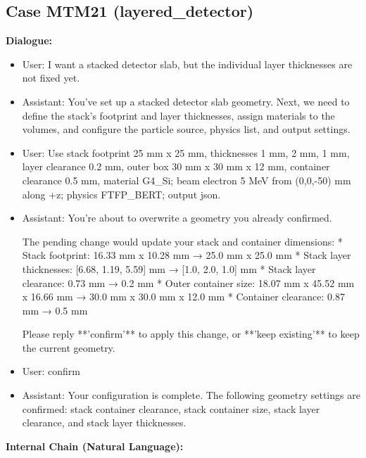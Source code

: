 \documentclass[11pt]{ctexart}
\begin{document}
\subsection{Case MTM21 (layered\_detector)}
\textbf{Dialogue:}
\begin{itemize}
\item User: I want a stacked detector slab, but the individual layer thicknesses are not fixed yet.
\item Assistant: You've set up a stacked detector slab geometry. Next, we need to define the stack's footprint and layer thicknesses, assign materials to the volumes, and configure the particle source, physics list, and output settings.
\item User: Use stack footprint 25 mm x 25 mm, thicknesses 1 mm, 2 mm, 1 mm, layer clearance 0.2 mm, outer box 30 mm x 30 mm x 12 mm, container clearance 0.5 mm, material G4\_Si; beam electron 5 MeV from (0,0,-50) mm along +z; physics FTFP\_BERT; output json.
\item Assistant: You're about to overwrite a geometry you already confirmed.

The pending change would update your stack and container dimensions:
*   Stack footprint: 16.33 mm x 10.28 mm → 25.0 mm x 25.0 mm
*   Stack layer thicknesses: [6.68, 1.19, 5.59] mm → [1.0, 2.0, 1.0] mm
*   Stack layer clearance: 0.73 mm → 0.2 mm
*   Outer container size: 18.07 mm x 45.52 mm x 16.66 mm → 30.0 mm x 30.0 mm x 12.0 mm
*   Container clearance: 0.87 mm → 0.5 mm

Please reply **'confirm'** to apply this change, or **'keep existing'** to keep the current geometry.
\item User: confirm
\item Assistant: Your configuration is complete. The following geometry settings are confirmed: stack container clearance, stack container size, stack layer clearance, and stack layer thicknesses.
\end{itemize}
\textbf{Internal Chain (Natural Language):}
\end{document}
